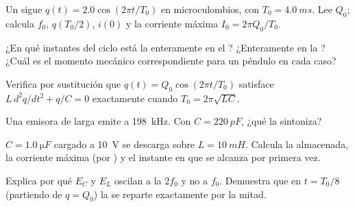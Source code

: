 \begin{exercise}[$\star$]\label{exo:g12:rlc-oscillations:4}
Un  sigue $q(t) = 2.0\cos(2\pi t/T_0)$ en microculombios, con
$T_0 = \qty{4.0}{ms}$. Lee $Q_0$; calcula $f_0$, $q(T_0/2)$, $i(0)$ y la corriente
máxima $I_0 = 2\pi Q_0/T_0$.
\end{exercise}

\begin{exercise}[$\star$]\label{exo:g12:rlc-oscillations:5}
¿En qué instantes del ciclo está la  enteramente en el ?
¿Enteramente en la ? ¿Cuál es el momento mecánico correspondiente para un
péndulo en cada caso?
\end{exercise}

\begin{exercise}[$\star\star$]\label{exo:g12:rlc-oscillations:6}
Verifica por sustitución que $q(t) = Q_0\cos(2\pi t/T_0)$ satisface
$L\,d^2q/dt^2 + q/C = 0$ exactamente cuando $T_0 = 2\pi\sqrt{LC}$.
\end{exercise}

\begin{exercise}[$\star\star$]\label{exo:g12:rlc-oscillations:7}
Una emisora de  larga emite a \qty{198}{kHz}. Con $C = \qty{220}{pF}$, ¿qué
 la sintoniza?
\end{exercise}

\begin{exercise}[$\star\star$]\label{exo:g12:rlc-oscillations:8}
$C = \qty{1.0}{\micro F}$ cargado a \qty{10}{V} se descarga sobre $L = \qty{10}{mH}$.
Calcula la  almacenada, la corriente máxima (por ) y
el instante en que se alcanza por primera vez.
\end{exercise}

\begin{exercise}[$\star\star$]\label{exo:g12:rlc-oscillations:9}
Explica por qué $E_C$ y $E_L$ oscilan a la  $2f_0$ y no a $f_0$. Demuestra
que en $t = T_0/8$ (partiendo de $q = Q_0$) la  se reparte exactamente por la
mitad.
\end{exercise}

